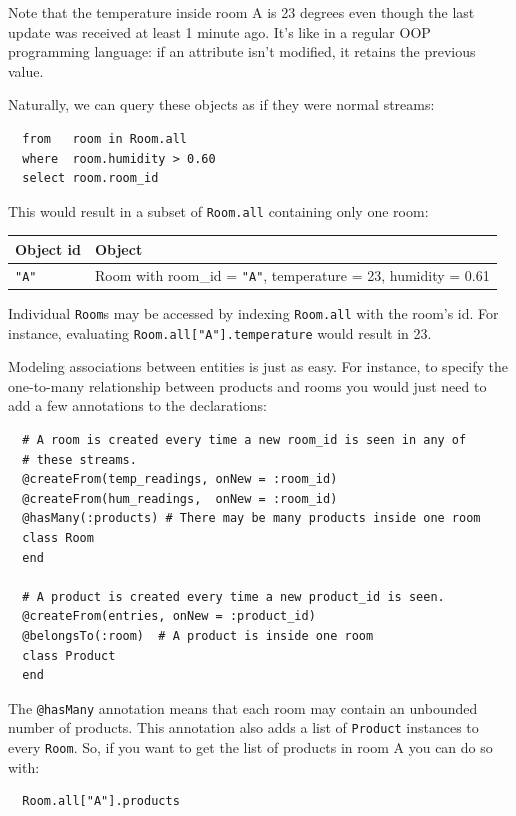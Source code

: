 \documentclass[a4,11pt]{report}
\begin{document}
Note that the temperature inside room A is 23 degrees even though the
last update was received at least 1 minute ago. It's like in a regular
OOP programming language: if an attribute isn't modified, it retains
the previous value.

Naturally, we can query these objects as if they were normal streams:

\begin{lstlisting}
  from   room in Room.all
  where  room.humidity > 0.60
  select room.room_id
\end{lstlisting}

This would result in a subset of \verb=Room.all= containing only one
room:

\begin{tabular}{ |l|l| }
  \hline
  Object id & Object \\
  \hline
  \verb="A"= & Room with room\_id = \verb="A"=, temperature = 23, humidity = 0.61 \\
  \hline
\end{tabular}

Individual \verb=Room=s may be accessed by indexing \verb=Room.all=
with the room's id. For instance, evaluating
\verb=Room.all["A"].temperature= would result in 23.

Modeling associations between entities is just as easy. For instance,
to specify the one-to-many relationship between products and rooms you
would just need to add a few annotations to the declarations:

\begin{lstlisting}
  # A room is created every time a new room_id is seen in any of
  # these streams.
  @createFrom(temp_readings, onNew = :room_id)
  @createFrom(hum_readings,  onNew = :room_id)
  @hasMany(:products) # There may be many products inside one room
  class Room
  end

  # A product is created every time a new product_id is seen.
  @createFrom(entries, onNew = :product_id)
  @belongsTo(:room)  # A product is inside one room
  class Product
  end
\end{lstlisting}

The \verb=@hasMany= annotation means that each room may contain an
unbounded number of products. This annotation also adds a list of
\verb=Product= instances to every \verb=Room=. So, if you want to get
the list of products in room A you can do so with:

\begin{lstlisting}
  Room.all["A"].products
\end{lstlisting}
\end{document}
